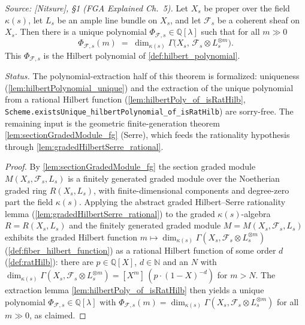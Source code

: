 \begin{theorem}
  \label{thm:hilbertPoly_of_sectionModule}
  \textit{Source: [Nitsure], \S 1 (FGA Explained Ch.~5).}
  Let \(X_s\) be proper over the field \(\kappa(s)\), let \(L_s\) be an ample line
  bundle on \(X_s\), and let \(\mathcal{F}_s\) be a coherent sheaf on \(X_s\).
  Then there is a unique polynomial \(\Phi_{\mathcal{F},s} \in \mathbb{Q}[\lambda]\)
  such that for all \(m \gg 0\)
  \[
    \Phi_{\mathcal{F},s}(m)
    \;=\; \dim_{\kappa(s)} \Gamma\bigl(X_s,\, \mathcal{F}_s \otimes L_s^{\otimes m}\bigr).
  \]
  This \(\Phi_{\mathcal{F},s}\) is the Hilbert polynomial of
  \cref{def:hilbert_polynomial}.

  \emph{Status.} The polynomial-extraction half of this theorem is formalized:
  uniqueness (\cref{lem:hilbertPolynomial_unique}) and the extraction of the
  unique polynomial from a rational Hilbert function
  (\cref{lem:hilbertPoly_of_isRatHilb},
  \texttt{Scheme.existsUnique\_hilbertPolynomial\_of\_isRatHilb}) are
  sorry-free. The remaining input is the geometric finite-generation theorem
  \cref{lem:sectionGradedModule_fg} (Serre), which feeds the rationality
  hypothesis through \cref{lem:gradedHilbertSerre_rational}.
\end{theorem}

\begin{proof}
  By \cref{lem:sectionGradedModule_fg} the section graded module
  \(M(X_s, \mathcal{F}_s, L_s)\) is a finitely generated graded module over the
  Noetherian graded ring \(R(X_s, L_s)\), with finite-dimensional components and
  degree-zero part the field \(\kappa(s)\). Applying the abstract graded
  Hilbert--Serre rationality lemma (\cref{lem:gradedHilbertSerre_rational}) to the
  graded \(\kappa(s)\)-algebra \(R = R(X_s, L_s)\) and the finitely generated
  graded module \(M = M(X_s, \mathcal{F}_s, L_s)\) exhibits the graded Hilbert
  function
  \(m \mapsto \dim_{\kappa(s)} \Gamma(X_s, \mathcal{F}_s \otimes L_s^{\otimes m})\)
  (\cref{def:fiber_hilbert_function}) as a rational Hilbert function of some
  order \(d\) (\cref{def:ratHilb}): there are \(p \in \mathbb{Q}[X]\),
  \(d \in \mathbb{N}\) and an \(N\) with
  \(\dim_{\kappa(s)} \Gamma(X_s, \mathcal{F}_s \otimes L_s^{\otimes m})
  = [X^m]\,(p \cdot (1 - X)^{-d})\) for \(m > N\). The extraction lemma
  \cref{lem:hilbertPoly_of_isRatHilb} then yields a unique polynomial
  \(\Phi_{\mathcal{F},s} \in \mathbb{Q}[\lambda]\) with
  \(\Phi_{\mathcal{F},s}(m) = \dim_{\kappa(s)}
  \Gamma(X_s, \mathcal{F}_s \otimes L_s^{\otimes m})\) for all \(m \gg 0\),
  as claimed.
\end{proof}

